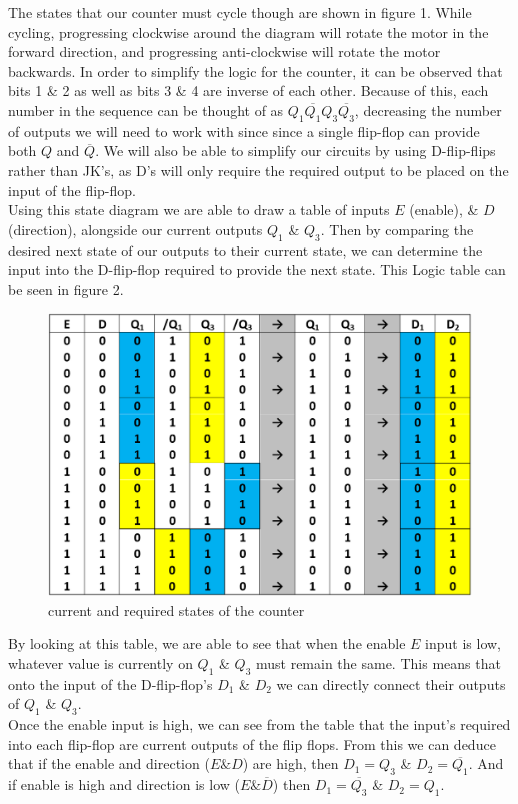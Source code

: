 \documentclass[a4paper,11pt]{article}
\begin{document}
The states that our counter must cycle though are shown in figure 1. While cycling, progressing clockwise around the diagram will rotate the motor in the forward direction, and progressing anti-clockwise will rotate the motor backwards. In order to simplify the logic for the counter, it can be observed that bits 1 \& 2 as well as bits 3 \& 4 are inverse of each other. Because of this, each number in the sequence can be thought of as  $Q_{1} \overline{Q_{1}} Q_{3} \overline{Q_{3}}$, decreasing the number of outputs we will need to work with since since a single flip-flop can provide both $Q$ and $\overline{Q}$. We will also be able to simplify our circuits by using D-flip-flips rather than JK's, as D's will only require the required output to be placed on the input of the flip-flop.\\
\linebreak
Using this state diagram we are able to draw a table of inputs $E$ (enable), \& $D$ (direction), alongside our current outputs  $Q_{1}$ \& $Q_{3}$. Then by comparing the desired next state of our outputs to their current state, we can determine the input into the D-flip-flop required to provide the next state. This Logic table can be seen in figure 2.\\
\newpage
\begin{figure}[h]
\centering
\includegraphics[width=\linewidth]{state_table.png}
\caption{current and required states of the counter}
\end{figure}
By looking at this table, we are able to see that when the enable $E$ input is low, whatever value is currently on $Q_{1}$ \& $Q_{3}$ must remain the same. This means that onto the input of the D-flip-flop's $D_{1}$ \& $D_{2}$ we can directly connect their outputs of $Q_{1}$ \& $Q_{3}$.\\
Once the enable input is high, we can see from the table that the input's required into each flip-flop are current outputs of the flip flops. From this we can deduce that if the enable and direction ($E \& D$) are high, then $D_{1} = Q_{3}$ \& $D_{2} = \overline{Q_{1}}$. And if enable is high and direction is low ($E \& \overline{D}$) then $D_{1} = \overline{Q_{3}}$ \& $D_{2} = Q_{1}$.
\\[5pt]
\end{document}
